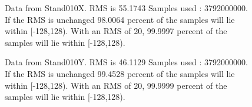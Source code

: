 \begin{figure}[ht] 				 				 				\caption{Data from Stand010X. RMS is 55.1743 Samples used : 3792000000. If the RMS is unchanged 98.0064 percent of the samples will lie within [-128,128).  				 With an RMS of 20, 99.9997 percent of the samples will lie within [-128,128).} 				\end{figure} 

\begin{figure}[ht] 				 				 				\caption{Data from Stand010Y. RMS is 46.1129 Samples used : 3792000000. If the RMS is unchanged 99.4528 percent of the samples will lie within [-128,128).  				 With an RMS of 20, 99.9999 percent of the samples will lie within [-128,128).} 				\end{figure} 

